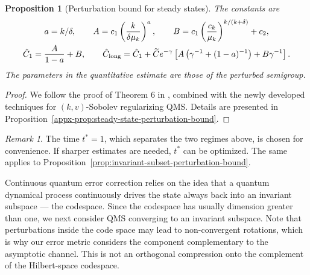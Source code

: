 \documentclass[11pt]{article}
\theoremstyle{myplain}
\newtheorem{prop}[prop]{Proposition}
\theoremstyle{mydefinition}
\theoremstyle{remark}
\newtheorem{rmk}[ex]{Remark}
\DeclareMathOperator{\1}{\mathds{1}}
\begin{document}
\begin{prop}[Perturbation bound for steady states]
            
            The constants are
            \begin{equation}\label{eq:perturbation-convolution-constants}
                \begin{gathered}
                    a=k/\delta,\qquad A=c_1\left(\frac{k}{\delta\mu_k}\right)^a,
                    \qquad B=c_1\left(\frac{c_k}{\mu_k}\right)^{k/(k+\delta)}+c_2,\\
                    \hat C_1=\frac{A}{1-a}+B,\qquad
                    \hat C_{\rm long}=\hat C_1+\widetilde C e^{-\gamma}
                    \left[A\left(\gamma^{-1}+(1-a)^{-1}\right)+B\gamma^{-1}\right].
                \end{gathered}
            \end{equation}
            The parameters in the quantitative estimate are those of the perturbed semigroup.
            
        \end{prop}
        \begin{proof}
            We follow the proof of Theorem 6 in \cite{Szehr.2013}, combined with the newly developed techniques for $(k,v)$-Sobolev regularizing QMS. Details are presented in Proposition~\ref{appx-prop:steady-state-perturbation-bound}.
        \end{proof}

        \begin{rmk}
            The time $t^*=1$, which separates the two regimes above, is chosen for convenience. If sharper estimates are needed, $t^*$ can be optimized. The same applies to Proposition~\ref{prop:invariant-subset-perturbation-bound}.
        \end{rmk}

        Continuous quantum error correction relies on the idea that a quantum dynamical process continuously drives the state always back into an invariant subspace --- the codespace. Since the codespace has usually dimension greater than one, we next consider QMS converging to an invariant subspace. Note that perturbations inside the code space may lead to non-convergent rotations, which is why our error metric considers the component complementary to the asymptotic channel. This is not an orthogonal compression onto the complement of the Hilbert-space codespace.
\end{document}
